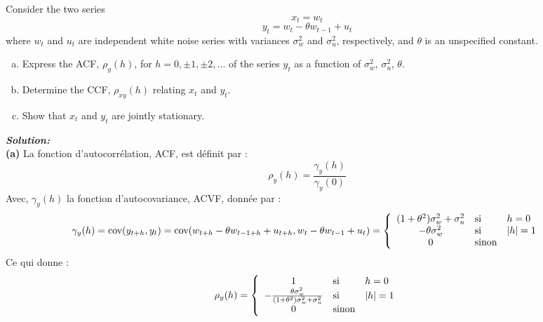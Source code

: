 \documentclass{homework}
\begin{document}
Consider the two series
$$x_t = w_t$$
$$y_t = w_t - \theta w_{t-1} + u_t$$
where $w_t$ and $u_t$ are independent white noise series with variances $\sigma^2_w$ and $\sigma^2_u$, respectively, and $\theta$ is an unspecified constant.
\begin{enumerate}[(a)]
    \item Express the ACF, $\rho_y(h)$, for $h = 0, \pm1, \pm2,...$ of the series $y_t$ as a function of $\sigma^2_w$, $\sigma^2_u$, $\theta$.
    \item Determine the CCF, $\rho_{xy}(h)$ relating $x_t$ and $y_t$.
    \item Show that $x_t$ and $y_t$ are jointly stationary.\\
\end{enumerate}
\textit{\textbf{Solution:}}\\
\textbf{(a)} La fonction d'autocorrélation, ACF, est définit par :
$$
\rho_y(h) = \frac{\gamma_y(h)}{\gamma_y(0)}
$$
Avec, $\gamma_y(h)$ la fonction d'autocovariance, ACVF, donnée par : 
$$
\gamma_y(h) = \text{cov}(y_{t+h}, y_t) \\
            = \text{cov}(w_{t+h} - \theta w_{t-1+h} + u_{t+h}, w_t - \theta w_{t-1} + u_t) \\
            = \left\{
                \begin{array}{c l l}
                    (1 + \theta^2)\sigma_w^2 + \sigma_u^2 &\text{si}& h = 0\\
                    -\theta\sigma_w^2 &\text{si}& |h| = 1 \\
                    0 &\text{sinon}&
                \end{array}
               \right.
$$
Ce qui donne :
$$
\rho_y(h) = \left\{
                \begin{array}{c l l}
                    1 &\text{si}& h = 0\\
                    -\frac{\theta\sigma_w^2}{(1 + \theta^2)\sigma_w^2 + \sigma_u^2} &\text{si}& |h| = 1 \\
                    0 &\text{sinon}&
                \end{array}
               \right.
$$
\end{document}
